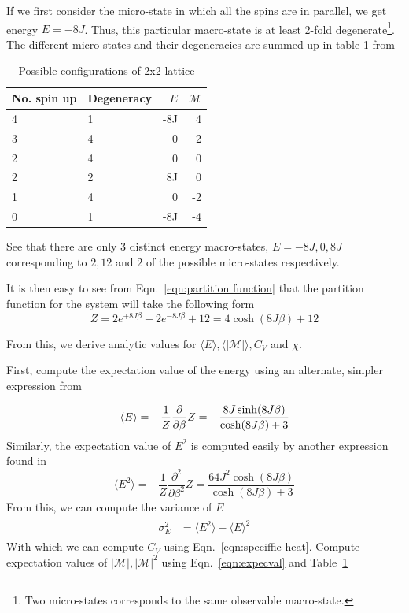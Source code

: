 \documentclass[10pt,showpacs,preprintnumbers,amsmath,amssymb,nofootinbib,aps,prl,twocolumn,groupedaddress,superscriptaddress,showkeys]{revtex4-1}
\begin{document}
    If we first consider the micro-state in which all the spins are in parallel, we get energy $E=-8J$. Thus, this particular macro-state is at least 2-fold degenerate\footnote{Two micro-states corresponds to the same observable macro-state.}.
    The different micro-states and their degeneracies are summed up in table \ref{tab:2x2energies} from \textcite{statmek_lecnotes}

    \begin{table}[H]
      \centering
      \caption{\label{tab:2x2energies} Possible configurations of 2x2 lattice}
      \begin{tabular}{llrr}
        No. spin up & Degeneracy & $E$ & $\mathcal M$ \\ \hline
        4 & 1 & -8J & 4 \\
        3 & 4 & 0 & 2 \\
        2 & 4 & 0 & 0 \\
        2 & 2 & 8J & 0 \\
        1 & 4 & 0 & -2 \\
        0 & 1 & -8J & -4 \\ \hline
      \end{tabular}
    \end{table}

    See that there are only 3 distinct energy macro-states, $E=-8J, 0, 8J$ corresponding to $2, 12$ and $2$ of the possible micro-states respectively.

    It is then easy to see from Eqn.~\ref{eqn:partition function} that the partition function for the system will take the following form
    \begin{equation}
      Z = 2e^{+8J\beta} + 2e^{-8J\beta} + 12 = 4\cosh(8J\beta) + 12
    \end{equation}

    From this, we derive analytic values for $\langle E \rangle, \langle |\mathcal M| \rangle , C_V$ and $\chi$. 

    First, compute the expectation value of the energy using an alternate, simpler expression from \textcite[Ch~6.2]{schroeder}

    \begin{equation}
      \langle E \rangle = -\frac{1}{Z}\pderivative{\beta}Z = -\frac{8J\sinh(8J\beta)}{\cosh(8J\beta) + 3}
    \end{equation}
    Similarly, the expectation value of $E^2$ is computed easily by another expression found in \textcite[Ch~6.2]{schroeder}
    \begin{equation}
      \langle E^2 \rangle = -\frac{1}{Z}\frac{\partial^2}{\partial\beta^2}Z = \frac{64J^2 \cosh(8J\beta)}{\cosh(8J\beta) + 3}
    \end{equation}
    From this, we can compute the variance of $E$
    \begin{align}
      \begin{split}
        \sigma_E^2 &= \langle E^2 \rangle - \langle E \rangle ^2 
      \end{split}
    \end{align}
    With which we can compute $C_V$ using Eqn.~\ref{eqn:speciffic heat}. Compute expectation values of $|\mathcal M|, |\mathcal M|^2$ using Eqn.~\ref{eqn:expecval} and Table~\ref{tab:2x2energies}
\end{document}
